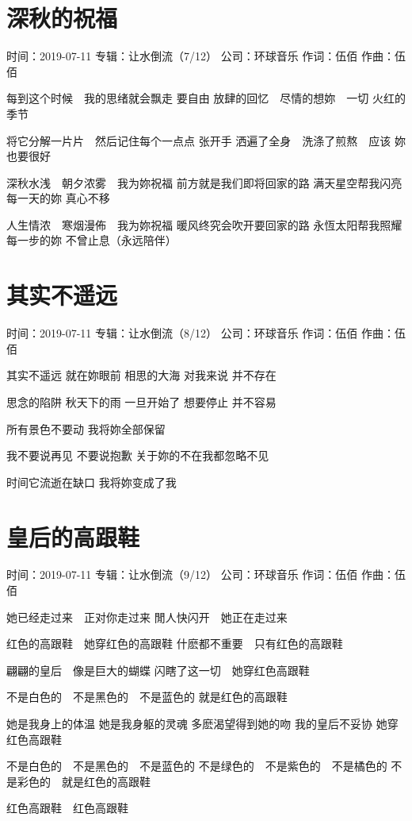 \documentclass[UTF8,a4paper,oneside,twocolumn,12pt]{ctexbook}
\newcommand{\infopair}[2]{\textbullet #1：#2}
\newcommand{\zc}[1][伍佰]{\infopair{作词}{#1}}
\newcommand{\zq}[1][伍佰]{\infopair{作曲}{#1}}
\newcommand{\zj}[1]{\infopair{专辑}{#1}}
\newcommand{\sj}[1]{\infopair{时间}{#1}}
\newcommand{\gs}[1]{\infopair{公司}{#1}}
\newenvironment{info}{\begin{flushleft}\kaishu
	}
	{\end{flushleft}\normalsize\yahei\par}
\newenvironment{lyric}{
	}
{}
\begin{document}
\section{深秋的祝福}
\begin{info}
	\sj{2019-07-11}
	\zj{让水倒流（7/12）}
	\gs{环球音乐}
	\zc
	\zq
\end{info}
\begin{lyric}
	每到这个时候　我的思绪就会飘走
	要自由
	放肆的回忆　尽情的想妳　一切
	火红的季节

	将它分解一片片　然后记住每个一点点
	张开手
	洒遍了全身　洗涤了煎熬　应该
	妳也要很好

	深秋水浅　朝夕浓雾　我为妳祝福
	前方就是我们即将回家的路
	满天星空帮我闪亮每一天的妳
	真心不移

	人生情浓　寒烟漫佈　我为妳祝福
	暖风终究会吹开要回家的路
	永恆太阳帮我照耀每一步的妳
	不曾止息（永远陪伴）
\end{lyric}

\section{其实不遥远}
\begin{info}
	\sj{2019-07-11}
	\zj{让水倒流（8/12）}
	\gs{环球音乐}
	\zc
	\zq
\end{info}
\begin{lyric}
	其实不遥远
	就在妳眼前
	相思的大海
	对我来说 并不存在

	思念的陷阱
	秋天下的雨
	一旦开始了
	想要停止 并不容易

	所有景色不要动
	我将妳全部保留

	我不要说再见 不要说抱歉
	关于妳的不在我都忽略不见

	时间它流逝在缺口
	我将妳变成了我
\end{lyric}

\section{皇后的高跟鞋}
\begin{info}
	\sj{2019-07-11}
	\zj{让水倒流（9/12）}
	\gs{环球音乐}
	\zc
	\zq
\end{info}
\begin{lyric}
	她已经走过来　正对你走过来
	閒人快闪开　她正在走过来

	红色的高跟鞋　她穿红色的高跟鞋
	什麽都不重要　只有红色的高跟鞋

	翩翩的皇后　像是巨大的蝴蝶
	闪瞎了这一切　她穿红色高跟鞋

	不是白色的　不是黑色的　不是蓝色的
	就是红色的高跟鞋

	她是我身上的体温
	她是我身躯的灵魂
	多麽渴望得到她的吻
	我的皇后不妥协
	她穿红色高跟鞋

	不是白色的　不是黑色的　不是蓝色的
	不是绿色的　不是紫色的　不是橘色的
	不是彩色的　就是红色的高跟鞋

	红色高跟鞋　红色高跟鞋
\end{lyric}
\end{document}
